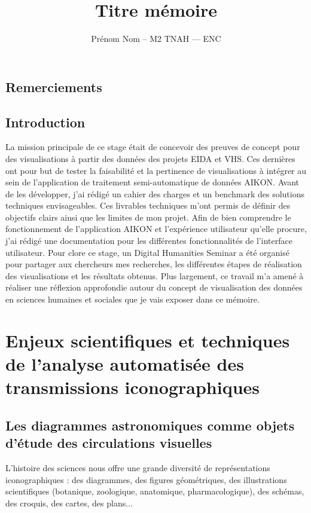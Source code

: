 \documentclass[a4paper,12pt,twoside]{book}
\author{Prénom Nom – M2 TNAH — ENC}
\title{Titre mémoire}
\newcommand\chapterNo[1]{
	\chapter*{#1}
	\markright{\MakeUppercase{#1}}
}
\begin{document}
	
	\onehalfspacing 
	
	\frontmatter
	
	
	
	\thispagestyle{empty}	
	\cleardoublepage
	
	
	
	\chapterNo{Remerciements}
	
	\chapterNo{Introduction}
	
	La mission principale de ce stage était de concevoir des preuves de concept pour des visualisations à partir des données des projets EIDA et VHS. Ces dernières ont pour but de tester la faisabilité et la pertinence de visualisations à intégrer au sein de l’application de traitement semi-automatique de données AIKON. Avant de les développer, j’ai rédigé un cahier des charges et un benchmark des solutions techniques envisageables. Ces livrables techniques m’ont permis de définir des objectifs clairs ainsi que les limites de mon projet. Afin de bien comprendre le fonctionnement de l’application AIKON et l’expérience utilisateur qu’elle procure, j’ai rédigé une documentation pour les différentes fonctionnalités de l’interface utilisateur. Pour clore ce stage, un Digital Humanities Seminar a été organisé pour partager aux chercheurs mes recherches, les différentes étapes de réalisation des visualisations et les résultats obtenus. Plus largement, ce travail m’a amené à réaliser une réflexion approfondie autour du concept de visualisation des données en sciences humaines et sociales que je vais exposer dans ce mémoire. 
	
	
	\thispagestyle{empty}
	\cleardoublepage
	
	\mainmatter
	
	\part{Enjeux scientifiques et techniques de l'analyse automatisée des transmissions iconographiques}

	
	\chapter[Les diagrammes astronomiques]{Les diagrammes astronomiques comme objets d'étude des circulations visuelles}
	
	L'histoire des sciences nous offre une grande diversité de représentations iconographiques : des diagrammes, des figures géométriques, des illustrations scientifiques (botanique, zoologique, anatomique, pharmacologique), des schémas, des croquis, des cartes, des plans...
	
\end{document}
